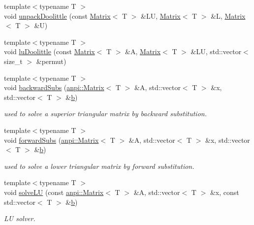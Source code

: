 \begin{DoxyCompactItemize}
\item 
{\footnotesize template$<$typename T $>$ }\\void \hyperlink{namespaceanpi_a64a55390c2c65ca78b464bc429823512}{unpack\+Doolittle} (const \hyperlink{classanpi_1_1Matrix}{Matrix}$<$ T $>$ \&LU, \hyperlink{classanpi_1_1Matrix}{Matrix}$<$ T $>$ \&L, \hyperlink{classanpi_1_1Matrix}{Matrix}$<$ T $>$ \&U)
\item 
{\footnotesize template$<$typename T $>$ }\\void \hyperlink{namespaceanpi_abaf1f0f8854af4b136dbfade58f959e6}{lu\+Doolittle} (const \hyperlink{classanpi_1_1Matrix}{Matrix}$<$ T $>$ \&A, \hyperlink{classanpi_1_1Matrix}{Matrix}$<$ T $>$ \&LU, std\+::vector$<$ size\+\_\+t $>$ \&permut)
\item 
{\footnotesize template$<$typename T $>$ }\\void \hyperlink{namespaceanpi_a51f75d22ef46354c73e5620dd720f249}{backward\+Subs} (\hyperlink{classanpi_1_1Matrix}{anpi\+::\+Matrix}$<$ T $>$ \&A, std\+::vector$<$ T $>$ \&x, std\+::vector$<$ T $>$ \&\hyperlink{program__options_8cpp_a03799bd905ea96cd38435410694bf05b}{b})
\begin{DoxyCompactList}\small\item\em used to solve a superior triangular matrix by backward substitution. \end{DoxyCompactList}\item 
{\footnotesize template$<$typename T $>$ }\\void \hyperlink{namespaceanpi_a3113babdff0dbc4eef36bd0b713a7f25}{forward\+Subs} (\hyperlink{classanpi_1_1Matrix}{anpi\+::\+Matrix}$<$ T $>$ \&A, std\+::vector$<$ T $>$ \&x, std\+::vector$<$ T $>$ \&\hyperlink{program__options_8cpp_a03799bd905ea96cd38435410694bf05b}{b})
\begin{DoxyCompactList}\small\item\em used to solve a lower triangular matrix by forward substitution. \end{DoxyCompactList}\item 
{\footnotesize template$<$typename T $>$ }\\void \hyperlink{namespaceanpi_a6764a07c6b16cedf0489a10e2650cc51}{solve\+LU} (const \hyperlink{classanpi_1_1Matrix}{anpi\+::\+Matrix}$<$ T $>$ \&A, std\+::vector$<$ T $>$ \&x, const std\+::vector$<$ T $>$ \&\hyperlink{program__options_8cpp_a03799bd905ea96cd38435410694bf05b}{b})
\begin{DoxyCompactList}\small\item\em LU solver. \end{DoxyCompactList}\item 

\end{DoxyCompactItemize}
